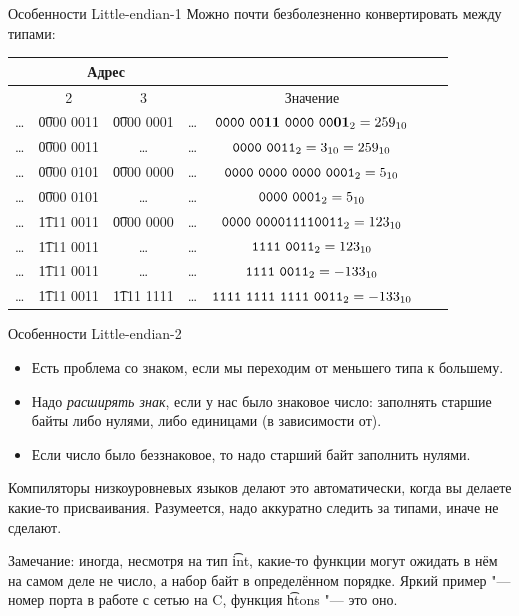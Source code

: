 \begin{frame}{Особенности Little-endian-1}
	Можно почти безболезненно конвертировать между типами:
	\begin{center}
		\begin{tabular}{|c|c|c|c|c|c|c|}
			\hline
			\multicolumn{4}{|c|}{Адрес} & \\\hline
			& 2 & 3 & & Значение \\\hline
			\dots & \t{0000 0011} & \t{0000 0001} & \dots & $\t{0000~00\textbf{11}~0000~00\textbf{01}}_2=259_{10}$ \\\hline
			\dots & \t{0000 0011} & \dots         & \dots & $\t{0000~0011}_2=3_{10}=259_{10}$ \\\hline
			\dots & \t{0000 0101} & \t{0000 0000} & \dots & $\t{0000~0000~0000~0001}_2=5_{10}$ \\\hline
			\dots & \t{0000 0101} & \dots         & \dots & $\t{0000~0001}_2=5_{10}$ \\\hline
			\dots & \t{1111 0011} & \t{0000 0000} & \dots & $\t{0000~0000 1111 0011}_2=123_{10}$ \\\hline
			\dots & \t{1111 0011} & \dots         & \dots & $\t{1111~0011}_2=123_{10}$ \\\hline
			\dots & \t{1111 0011} & \dots         & \dots & $\t{1111~0011}_2=-133_{10}$ \\\hline
			\dots & \t{1111 0011} & \t{1111 1111} & \dots & $\t{1111~1111~1111~0011}_2=-133_{10}$ \\\hline
		\end{tabular}
	\end{center}
\end{frame}

\begin{frame}{Особенности Little-endian-2}
	\begin{itemize}
		\item
			Есть проблема со знаком, если мы переходим от меньшего типа к большему.
		\item
			Надо \textit{расширять знак}, если у нас было знаковое число:
			заполнять старшие байты либо нулями, либо единицами (в зависимости от\only<2->{ старшего бита в числе}).
		\item
			Если число было беззнаковое, то надо старший байт заполнить нулями.
	\end{itemize}

	Компиляторы низкоуровневых языков делают это автоматически, когда вы делаете какие-то присваивания.
	Разумеется, надо аккуратно следить за типами, иначе не сделают.

	Замечание: иногда, несмотря на тип \t{int}, какие-то функции могут ожидать в нём на самом деле не число,
	а набор байт в определённом порядке.
	Яркий пример "--- номер порта в работе с сетью на C, функция \t{htons} "--- это оно.
\end{frame}

